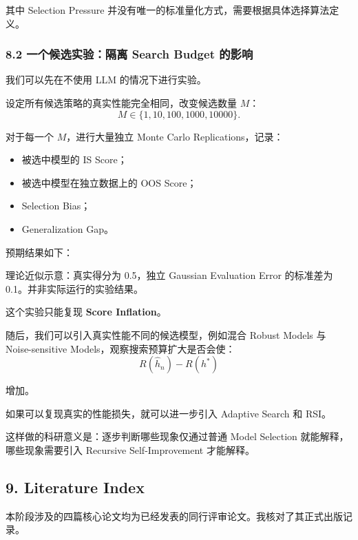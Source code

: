 其中 Selection Pressure 并没有唯一的标准量化方式，需要根据具体选择算法定义。

\hypertarget{part-2-16-0001-ux4e00ux4e2aux5019ux9009ux5b9eux9a8cux9694ux79bb-search-budget-ux7684ux5f71ux54cd}{%
\subsubsection{8.2 一个候选实验：隔离 Search Budget 的影响}\label{part-2-16-0001-ux4e00ux4e2aux5019ux9009ux5b9eux9a8cux9694ux79bb-search-budget-ux7684ux5f71ux54cd}}

我们可以先在不使用 LLM 的情况下进行实验。

设定所有候选策略的真实性能完全相同，改变候选数量 \(M\)：
\[M\in\{1,10,100,1000,10000\}.\]

对于每一个 \(M\)，进行大量独立 Monte Carlo Replications，记录：

\begin{itemize}
\tightlist
\item
  被选中模型的 IS Score；
\item
  被选中模型在独立数据上的 OOS Score；
\item
  Selection Bias；
\item
  Generalization Gap。
\end{itemize}

预期结果如下：


理论近似示意：真实得分为 0.5，独立 Gaussian Evaluation Error 的标准差为 0.1。并非实际运行的实验结果。

这个实验只能复现 \textbf{Score Inflation}。

随后，我们可以引入真实性能不同的候选模型，例如混合 Robust Models 与 Noise-sensitive Models，观察搜索预算扩大是否会使：
\[R(\hat h_n)-R(h^*)\]

增加。

如果可以复现真实的性能损失，就可以进一步引入 Adaptive Search 和 RSI。

这样做的科研意义是：逐步判断哪些现象仅通过普通 Model Selection 就能解释，哪些现象需要引入 Recursive Self-Improvement 才能解释。

\hypertarget{part-2-16-0001-literature-index}{%
\subsection{9. Literature Index}\label{part-2-16-0001-literature-index}}

本阶段涉及的四篇核心论文均为已经发表的同行评审论文。我核对了其正式出版记录。

